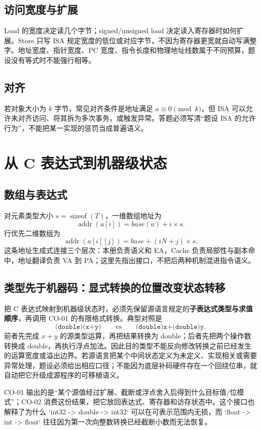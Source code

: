 \documentclass[UTF8,fontset=fandol,11pt,a4paper]{ctexart}
\begin{document}
\subsection{访问宽度与扩展}
Load 的宽度决定读几个字节；signed/unsigned load 决定读入寄存器时如何扩展。Store 只写 ISA 规定宽度的低位或对应字节，不因为寄存器更宽就自动写满整字。地址宽度、指针宽度、PC 宽度、指令长度和物理地址线数属于不同预算，题设没有等式时不能强行相等。

\subsection{对齐}
若对象大小为 $k$ 字节，常见对齐条件是地址满足 $a\equiv0\pmod{k}$，但 ISA 可以允许未对齐访问、将其拆为多次事务，或触发异常。答题必须写清“题设 ISA 的允许行为”，不能把某一实现的惩罚当成普遍语义。

\section{从 C 表达式到机器级状态}

\subsection{数组与表达式}
对元素类型大小 $s=\operatorname{sizeof}(T)$，一维数组地址为
\[
\operatorname{addr}(a[i])=base(a)+i\times s.
\]
行优先二维数组为
\[
\operatorname{addr}(a[i][j])=base+(iN+j)\times s.
\]
这条地址生成式连接三个层次：本册负责语义和 EA，Cache 负责局部性与副本命中，地址翻译负责 VA 到 PA；这里先指出接口，不把后两种机制混进指令语义。

\subsection{类型先于机器码：显式转换的位置改变状态转移}
把 C 表达式映射到机器级状态时，必须先保留源语言规定的\textbf{子表达式类型与求值顺序}，再调用 CO-01 的有限格式转换。典型对照是
\[
\texttt{(double)(x+y)}\qquad\text{vs}\qquad\texttt{(double)x+(double)y}.
\]
前者先完成 $x+y$ 的源类型运算，再把结果转换为 double；后者先把两个操作数转换成 double，再执行浮点加法。因此目的类型不能反向修改转换之前已经发生的运算宽度或溢出边界。若源语言把某个中间状态定义为未定义、实现相关或需要异常处理，题设必须给出相应口径；不能因为底层补码硬件存在一个回绕位串，就自动把它升级成源程序的可移植语义。

CO-01 输出的是“某个源值经过扩展、截断或浮点舍入后得到什么目标值/位模式”；CO-02 消费这份结果，把它放回表达式、寄存器和访存状态中。这个接口也解释了为什么 `int32 -> double -> int32` 可以在可表示范围内无损，而 `float -> int -> float` 往往因为第一次向整数转换已经截断小数而无法恢复。
\end{document}
